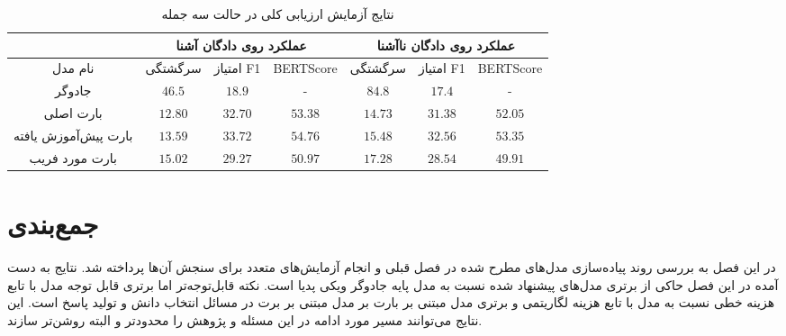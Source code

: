 \begin{table}[ht]
	\caption{نتایج آزمایش ارزیابی کلی در حالت سه جمله}
	\label{table:overall_trisentence}
	\begin{tabular}{|c|c|c|c|c|c|c|}
		\hline
		& \multicolumn{3}{c|}{عملکرد روی دادگان آشنا}            & \multicolumn{3}{c|}{عملکرد روی دادگان نا‌آشنا}         \\ \hline
		نام مدل              & سرگشتگی          & امتیاز F1        & BERTScore        & سرگشتگی          & امتیاز F1        & BERTScore        \\ \hline
		جادوگر               & $46.5$           & $18.9$           & -                & $84.8$           & $17.4$           & -                \\ \hline
		بارت اصلی            & $\mathbf{12.80}$ & $32.70$          & $53.38$          & $\mathbf{14.73}$ & $31.38$          & $52.05$          \\ \hline
		بارت پیش‌آموزش یافته & $13.59$          & $\mathbf{33.72}$ & $\mathbf{54.76}$ & $15.48$          & $\mathbf{32.56}$ & $\mathbf{53.35}$ \\ \hline
		بارت مورد فریب       & $15.02$          & $29.27$          & $50.97$          & $17.28$          & $28.54$          & $49.91$          \\ \hline
	\end{tabular}
\end{table}





\section{جمع‌بندی}
در این فصل به بررسی روند پیاده‌سازی مدل‌های مطرح شده در فصل قبلی و انجام آزمایش‌های متعدد برای سنجش آن‌ها پرداخته شد. نتایج به دست آمده در این فصل حاکی از برتری‌ مدل‌های پیشنهاد شده نسبت به مدل پایه جادوگر ویکی پدیا است. نکته قابل‌توجه‌تر اما برتری قابل توجه مدل‌ با تابع هزینه خطی نسبت به مدل با تابع هزینه لگاریتمی و برتری مدل مبتنی بر بارت بر مدل مبتنی بر برت در مسائل انتخاب دانش و تولید پاسخ است. این نتایج می‌توانند مسیر مورد ادامه در این مسئله و پژوهش را محدودتر و البته روشن‌تر سازند. 
